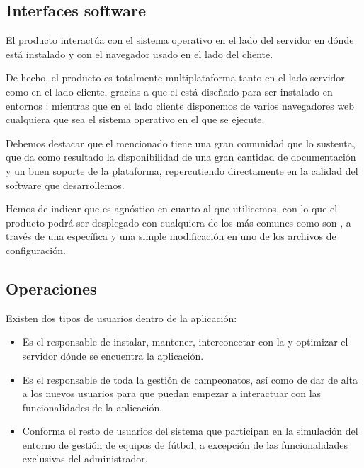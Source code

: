 \subsection{Interfaces software}
El producto interactúa con el sistema operativo en el lado del servidor en dónde
está instalado y con el navegador usado en el lado del cliente.

De hecho, el producto es totalmente multiplataforma tanto en el lado servidor
como en el lado cliente, gracias a que el  está diseñado
para ser instalado en entornos ; mientras que
en el lado cliente disponemos de varios navegadores web cualquiera que sea el
sistema operativo en el que se ejecute.

Debemos destacar que el mencionado  tiene una gran comunidad
que lo sustenta, que da como resultado la disponibilidad de una gran cantidad de
documentación y un buen soporte de la plataforma, repercutiendo directamente en
la calidad del software que desarrollemos.

Hemos de indicar que  es agnóstico en cuanto al  que
utilicemos, con lo que el producto podrá ser desplegado con cualquiera de los
 más comunes como son , a través de una  específica y una simple modificación
en uno de los archivos de configuración.

\subsection{Operaciones}
Existen dos tipos de usuarios dentro de la aplicación:

\begin{itemize}
\item {} Es el responsable de instalar, mantener,
  interconectar con la  y optimizar el servidor dónde se
  encuentra la aplicación.
\item {} Es el responsable de toda la gestión de
  campeonatos, así como de dar de alta a los nuevos usuarios para que puedan
  empezar a interactuar con las funcionalidades de la aplicación.
\item {} Conforma el resto de usuarios del sistema que
  participan en la simulación del entorno de gestión de equipos de fútbol, a
  excepción de las funcionalidades exclusivas del administrador.
\end{itemize}

